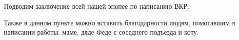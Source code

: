 \conclusion

Подводим заключение всей нашей эпопее по написанию ВКР.

Также в данном пункте можно вставить благодарности людям, помогавшим в написании работы: маме, дяде Феде с соседнего подъезда и коту.
